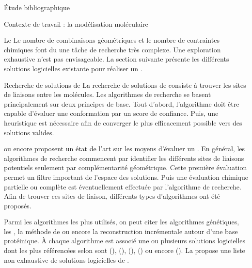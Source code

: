 \documentclass[myfrancais,ngerman,english,frenchb]{mythesis}
\begin{document}
\begin{mychapter}{Étude bibliographique}
\begin{mysection}{Contexte de travail : la modélisation moléculaire}
\begin{mysubsection}{Le }
				Le nombre de combinaisons géométriques et le nombre de contraintes chimiques font du  une tâche de recherche très complexe.
				Une exploration exhaustive n'est pas envisageable.
				La section suivante présente les différents solutions logicielles existante pour réaliser un .
			\end{mysubsection}
			\begin{mysubsection}{Recherche de solutions de }
				La recherche de solutions de  consiste à trouver les sites de liaisons entre les molécules.
				Les algorithmes de recherche se basent principalement sur deux principes de base.
				Tout d'abord, l'algorithme doit être capable d'évaluer une conformation par un score de confiance.
				Puis, une heuristique est nécessaire afin de converger le plus efficacement possible vers des solutions valides.

				 ou encore  proposent un état de l'art sur les moyens d'évaluer un .
				En général, les algorithmes de recherche commencent par identifier les différents sites de liaisons potentiels seulement par complémentarité géométrique.
				Cette première évaluation permet un filtre important de l'espace des solutions.
				Puis une évaluation chimique partielle ou complète est éventuellement effectuée par l'algorithme de recherche.
				Afin de trouver ces sites de liaison, différents types d'algorithmes ont été proposés.

				Parmi les algorithmes les plus utilisés, on peut citer les algorithmes génétiques, les , la méthode de  ou encore la reconstruction incrémentale autour d'une base protéinique.
				À chaque algorithme est associé une ou plusieurs solutions logicielles dont les plus référencées selon  sont \myAutoDock (), \myGOLD (), \myFlexX (), \myDOCK () ou encore \myICMDocking ().
				La  propose une liste non-exhaustive de solutions logicielles de .


\end{mysubsection}
\end{mysection}
\end{mychapter}
\end{document}
